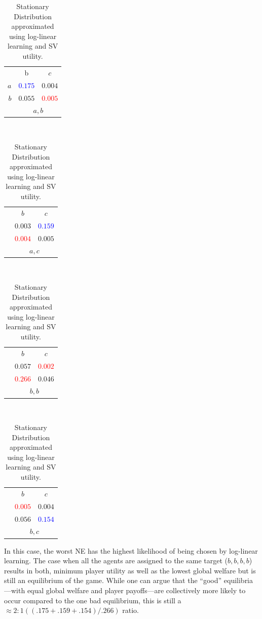 \documentclass[defaultstyle,12pt]{proposal}
\begin{document}
\begin{table}[!htb]
	\centering\begin{tabular}{r|c|c|}
	\multicolumn{1}{c}{}
	& \multicolumn{1}{c}{b}
	& \multicolumn{1}{c}{$c$}\\
	\cline{2-3}
	$a$ & \textcolor{blue}{$0.175$} & $0.004$\\
	\cline{2-3}
	$b$ & $0.055$ & \textcolor{red}{$0.005$}\\
	\cline{2-3}
	\multicolumn{1}{c}{}
	& \multicolumn{2}{c}{$a,b$}
	\end{tabular}~
	\centering\begin{tabular}{r|c|c|}
	\multicolumn{1}{c}{}
	& \multicolumn{1}{c}{$b$}
	& \multicolumn{1}{c}{$c$}\\
	\cline{2-3}
	& $0.003$ & \textcolor{blue}{$0.159$}\\
	\cline{2-3}
	& \textcolor{red}{$0.004$} & $0.005$\\
	\cline{2-3}
	\multicolumn{1}{c}{}
	& \multicolumn{2}{c}{$a,c$}
	\end{tabular}~
	\centering\begin{tabular}{r|c|c|}
	\multicolumn{1}{c}{}
	& \multicolumn{1}{c}{$b$}
	& \multicolumn{1}{c}{$c$}\\
	\cline{2-3}
	& $0.057$ & \textcolor{red}{$0.002$}\\
	\cline{2-3}
	& \textcolor{red}{$0.266$} & $0.046$\\
	\cline{2-3}
	\multicolumn{1}{c}{}
	& \multicolumn{2}{c}{$b,b$}
	\end{tabular}~
	\centering\begin{tabular}{r|c|c|}
	\multicolumn{1}{c}{}
	& \multicolumn{1}{c}{$b$}
	& \multicolumn{1}{c}{$c$}\\
	\cline{2-3}
	& \textcolor{red}{$0.005$} & $0.004$\\
	\cline{2-3}
	& $0.056$ & \textcolor{blue}{$0.154$}\\
	\cline{2-3}
	\multicolumn{1}{c}{}
	& \multicolumn{2}{c}{$b,c$}
	\end{tabular}
	\centering\caption{Stationary Distribution approximated using log-linear learning and SV utility.}\label{tab:svsd}
\end{table}

In this case, the worst NE has the highest likelihood of being chosen by log-linear learning. The case when all the agents are assigned to the same target ($b, b, b, b$) results in both, minimum player utility as well as the lowest global welfare but is still an equilibrium of the game. While one can argue that the ``good'' equilibria---with equal global welfare and player payoffs---are collectively more likely to occur compared to the one bad equilibrium, this is still a $\approx 2:1 ((.175 + .159 + .154) / .266)$ ratio.
\end{document}
